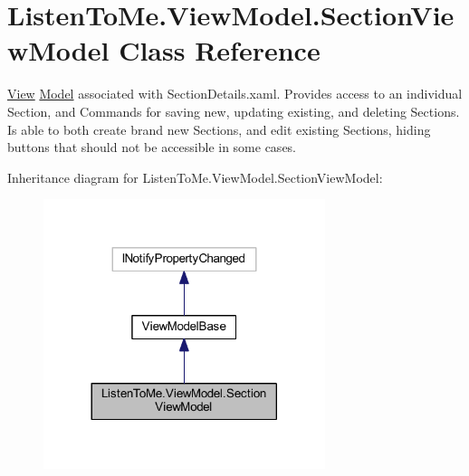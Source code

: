 \hypertarget{class_listen_to_me_1_1_view_model_1_1_section_view_model}{}\section{Listen\+To\+Me.\+View\+Model.\+Section\+View\+Model Class Reference}
\label{class_listen_to_me_1_1_view_model_1_1_section_view_model}


\hyperlink{namespace_listen_to_me_1_1_view}{View} \hyperlink{namespace_listen_to_me_1_1_model}{Model} associated with Section\+Details.\+xaml. Provides access to an individual Section, and Commands for saving new, updating existing, and deleting Sections. Is able to both create brand new Sections, and edit existing Sections, hiding buttons that should not be accessible in some cases.  




Inheritance diagram for Listen\+To\+Me.\+View\+Model.\+Section\+View\+Model\+:\nopagebreak
\begin{figure}[H]
\begin{center}
\leavevmode
\includegraphics[width=233pt]{class_listen_to_me_1_1_view_model_1_1_section_view_model__inherit__graph}
\end{center}
\end{figure}
